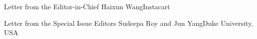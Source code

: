 \documentclass[11pt]{article}
\begin{document}


\begin{bulletin}


%
%

\begin{lettersection}


\begin{letter}{Letter from the Editor-in-Chief}
{Haixun Wang}{Instacart}

\end{letter}
%
\newpage
%
%
\begin{letter}{Letter from the Special Issue Editors} 
{Sudeepa Roy and Jun Yang}{Duke University, USA}


\end{letter}


\end{lettersection}

% 


\end{bulletin}
\end{document}
